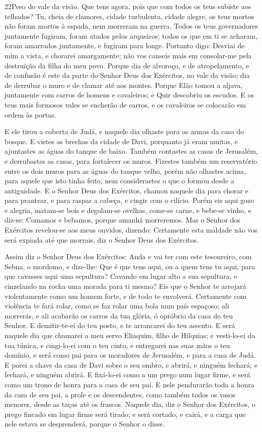 \lettrine{22}{}Peso do vale da visão. Que tens agora, pois que
com todos os teus subiste aos telhados? Tu, cheia de clamores,
cidade turbulenta, cidade alegre, os teus mortos não foram mortos à
espada, nem morreram na guerra. Todos os teus governadores
juntamente fugiram, foram atados pelos arqueiros; todos os que em ti
se acharam, foram amarrados juntamente, e fugiram para longe.
Portanto digo: Desviai de mim a vista, e chorarei amargamente;
não vos canseis mais em consolar-me pela destruição da filha do meu
povo. Porque dia de alvoroço, e de atropelamento, e de confusão
é este da parte do Senhor Deus dos Exércitos, no vale da visão; dia
de derrubar o muro e de clamar até aos montes. Porque Elão tomou
a aljava, juntamente com carros de homens e cavaleiros; e Quir
descobriu os escudos. E os teus mais formosos vales se encherão
de carros, e os cavaleiros se colocarão em ordem às portas.

E ele tirou a coberta de Judá, e naquele dia olhaste para as armas
da casa do bosque. E vistes as brechas da cidade de Davi,
porquanto já eram muitas, e ajuntastes as águas do tanque de baixo.
Também contastes as casas de Jerusalém, e derrubastes as
casas, para fortalecer os muros. Fizestes também um
reservatório entre os dois muros para as águas do tanque velho,
porém não olhastes acima, para aquele que isto tinha feito, nem
considerastes o que o formou desde a antiguidade. E o Senhor
Deus dos Exércitos, chamou naquele dia para chorar e para prantear,
e para raspar a cabeça, e cingir com o cilício. Porém eis
aqui gozo e alegria, matam-se bois e degolam-se ovelhas, come-se
carne, e bebe-se vinho, e diz-se: Comamos e bebamos, porque amanhã
morreremos. Mas o Senhor dos Exércitos revelou-se aos meus
ouvidos, dizendo: Certamente esta maldade não vos será expiada até
que morrais, diz o Senhor Deus dos Exércitos.

Assim diz o Senhor Deus dos Exércitos: Anda e vai ter com este
tesoureiro, com Sebna, o mordomo, e dize-lhe: Que é que tens
aqui, ou a quem tens tu aqui, para que cavasses aqui uma sepultura?
Cavando em lugar alto a sua sepultura, e cinzelando na rocha uma
morada para ti mesmo? Eis que o Senhor te arrojará
violentamente como um homem forte, e de todo te envolverá.
Certamente com violência te fará rolar, como se faz rolar uma
bola num país espaçoso; ali morrerás, e ali acabarão os carros da
tua glória, ó opróbrio da casa do teu Senhor. E demitir-te-ei
do teu posto, e te arrancarei do teu assento. E será naquele
dia que chamarei a meu servo Eliaquim, filho de Hilquias; e
vesti-lo-ei da tua túnica, e cingi-lo-ei com o teu cinto, e
entregarei nas suas mãos o teu domínio, e será como pai para os
moradores de Jerusalém, e para a casa de Judá. E porei a
chave da casa de Davi sobre o seu ombro, e abrirá, e ninguém
fechará; e fechará, e ninguém abrirá.
 E fixá-lo-ei como a um prego num lugar firme, e será como um
trono de honra para a casa de seu pai. E nele pendurarão toda
a honra da casa de seu pai, a prole e os descendentes, como também
todos os vasos menores, desde as taças até os frascos.
Naquele dia, diz o Senhor dos Exércitos, o prego fincado em
lugar firme será tirado; e será cortado, e cairá, e a carga que nele
estava se desprenderá, porque o Senhor o disse.

